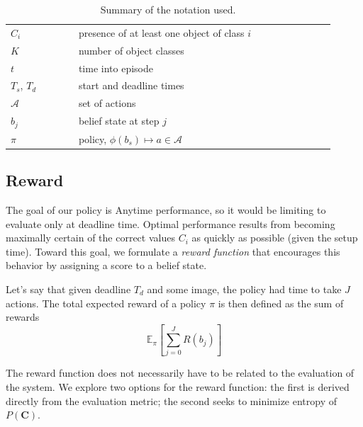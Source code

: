 \documentclass[runningheads]{llncs}
\begin{document}
\begin{table}
\centering
\caption{Summary of the notation used.}
\label{tab:notation}
\begin{tabular}{|l|l|}
	\hline
	$C_i$         & presence of at least one object of class $i$  \\ 
	$K$           & number of object classes                      \\ 
	$t$           & time into episode                             \\ 
	$T_s$, $T_d$  & start and deadline times                      \\ 
	$\mathcal{A}$ & set of actions                                \\ 
	$b_j$        	& belief state at step $j$                                 \\ 
	$\pi$         & policy, $\phi(b_s) \mapsto a \in \mathcal{A}$ \\ 
	\hline
\end{tabular}\end{table}

\subsection{Reward} \label{sec:reward}
The goal of our policy is Anytime performance, so it would be limiting to evaluate only at deadline time.
Optimal performance results from becoming maximally certain of the correct values $C_i$ as quickly as possible (given the setup time).
Toward this goal, we formulate a \emph{reward function} that encourages this behavior by assigning a score to a belief state.

Let's say that given deadline $T_d$ and some image, the policy had time to take $J$ actions.
The total expected reward of a policy $\pi$ is then defined as the sum of rewards
\begin{equation}
\mathbb{E}_\pi[\sum_{j=0}^J R(b_j)]
\end{equation}

The reward function does not necessarily have to be related to the evaluation of the system.
We explore two options for the reward function: the first is derived directly from the evaluation metric; the second seeks to minimize entropy of $P(\mathbf{C})$.
\end{document}
